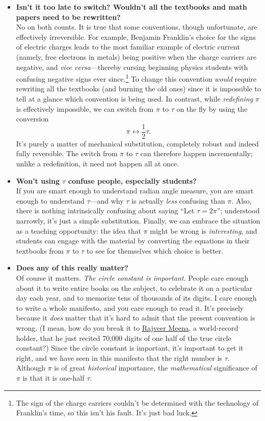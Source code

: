 {\begin{itemize}
  \item \textbf{Isn't it too late to switch? Wouldn't all the textbooks and math papers need to be rewritten?} \\ No on both counts. It is true that some conventions, though unfortunate, are effectively irreversible. For example, Benjamin Franklin's choice for the signs of electric charges leads to the most familiar example of electric current (namely, free electrons in metals) being positive when the charge carriers are negative, and \emph{vice versa}---thereby cursing beginning physics students with confusing negative signs ever since.\footnote{The sign of the charge carriers couldn't be determined with the technology of Franklin's time, so this isn't his fault. It's just bad luck.} To change this convention \emph{would} require rewriting all the textbooks (and burning the old ones) since it is impossible to tell at a glance which convention is being used. In contrast, while \emph{redefining} $\pi$ is effectively impossible, we can switch from $\pi$ to $\tau$ on the fly by using the conversion \[ \pi \leftrightarrow \textstyle{\frac{1}{2}}\tau. \] It's purely a matter of mechanical substitution, completely robust and indeed fully reversible. The switch from $\pi$ to $\tau$ can therefore happen incrementally; unlike a redefinition, it need not happen all at once.

  \item \textbf{Won't using $\tau$ confuse people, especially students?} \\  If you are smart enough to understand radian angle measure, you are smart enough to understand $\tau$---and  why $\tau$ is actually \emph{less} confusing than $\pi$. Also, there is nothing intrinsically confusing about saying ``Let $\tau = 2\pi$''; understood narrowly, it's just a simple substitution. Finally, we can embrace the situation as a teaching opportunity: the idea that $\pi$ might be wrong is \emph{interesting}, and students can engage with the material by converting the equations in their textbooks from $\pi$ to $\tau$ to see for themselves which choice is better.

  \item \textbf{Does any of this really matter?} \\ Of course it matters. \emph{The circle constant is important.} People care enough about it to write entire books on the subject, to celebrate it on a particular day each year, and to memorize tens of thousands of its digits. I care enough to write a whole manifesto, and you care enough to read it. It's precisely because it \emph{does} matter that it's hard to admit that the present convention is wrong. (I mean, how do you break it to \href{https://www.guinnessworldrecords.com/world-records/most-pi-places-memorised}{Rajveer Meena}, a world-record holder, that he just recited 70,000 digits of one half of the true circle constant?) Since the circle constant is important, it's important to get it right, and we have seen in this manifesto that the right number is $\tau$. Although $\pi$ is of great \emph{historical} importance, the \emph{mathematical} significance of $\pi$ is that it is one-half $\tau$.


\end{itemize}}
